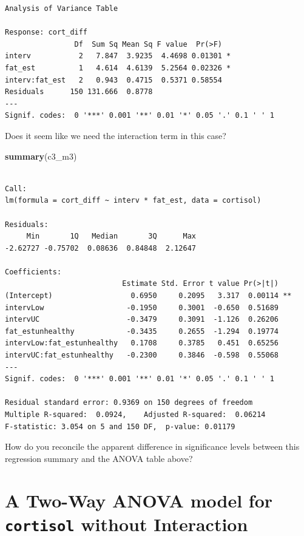 \documentclass[]{book}
\newenvironment{Shaded}{\begin{snugshade}}{\end{snugshade}}
\newcommand{\KeywordTok}[1]{\textcolor[rgb]{0.13,0.29,0.53}{\textbf{#1}}}
\newcommand{\NormalTok}[1]{#1}
\theoremstyle{definition}
\theoremstyle{definition}
\theoremstyle{definition}
\theoremstyle{remark}
\begin{document}
\begin{verbatim}
Analysis of Variance Table

Response: cort_diff
                Df  Sum Sq Mean Sq F value  Pr(>F)  
interv           2   7.847  3.9235  4.4698 0.01301 *
fat_est          1   4.614  4.6139  5.2564 0.02326 *
interv:fat_est   2   0.943  0.4715  0.5371 0.58554  
Residuals      150 131.666  0.8778                  
---
Signif. codes:  0 '***' 0.001 '**' 0.01 '*' 0.05 '.' 0.1 ' ' 1
\end{verbatim}

Does it seem like we need the interaction term in this case?

\begin{Shaded}
\begin{Highlighting}[]
\KeywordTok{summary}\NormalTok{(c3_m3)}
\end{Highlighting}
\end{Shaded}

\begin{verbatim}

Call:
lm(formula = cort_diff ~ interv * fat_est, data = cortisol)

Residuals:
     Min       1Q   Median       3Q      Max 
-2.62727 -0.75702  0.08636  0.84848  2.12647 

Coefficients:
                           Estimate Std. Error t value Pr(>|t|)   
(Intercept)                  0.6950     0.2095   3.317  0.00114 **
intervLow                   -0.1950     0.3001  -0.650  0.51689   
intervUC                    -0.3479     0.3091  -1.126  0.26206   
fat_estunhealthy            -0.3435     0.2655  -1.294  0.19774   
intervLow:fat_estunhealthy   0.1708     0.3785   0.451  0.65256   
intervUC:fat_estunhealthy   -0.2300     0.3846  -0.598  0.55068   
---
Signif. codes:  0 '***' 0.001 '**' 0.01 '*' 0.05 '.' 0.1 ' ' 1

Residual standard error: 0.9369 on 150 degrees of freedom
Multiple R-squared:  0.0924,    Adjusted R-squared:  0.06214 
F-statistic: 3.054 on 5 and 150 DF,  p-value: 0.01179
\end{verbatim}

How do you reconcile the apparent difference in significance levels
between this regression summary and the ANOVA table above?

\section{\texorpdfstring{A Two-Way ANOVA model for \texttt{cortisol}
without
Interaction}{A Two-Way ANOVA model for cortisol without Interaction}}\label{a-two-way-anova-model-for-cortisol-without-interaction}
\end{document}
